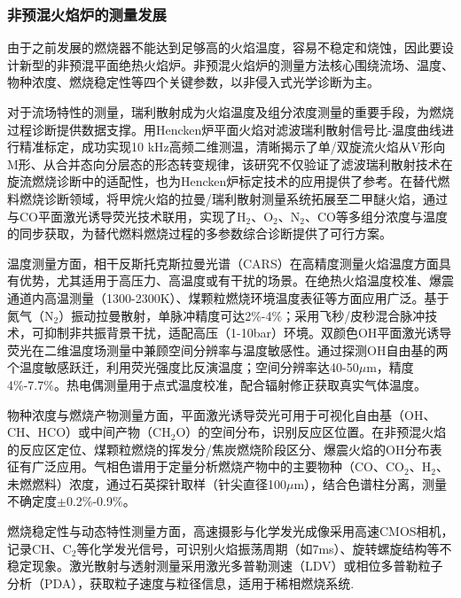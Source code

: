 \subsubsection{非预混火焰炉的测量发展}

由于之前发展的燃烧器不能达到足够高的火焰温度，容易不稳定和烧蚀，因此要设计新型的非预混平面绝热火焰炉。非预混火焰炉的测量方法核心围绕流场、温度、物种浓度、燃烧稳定性等四个关键参数，以非侵入式光学诊断为主。

对于流场特性的测量，瑞利散射成为火焰温度及组分浓度测量的重要手段，为燃烧过程诊断提供数据支撑。用Hencken炉平面火焰对滤波瑞利散射信号比-温度曲线进行精准标定，成功实现10 kHz高频二维测温，清晰揭示了单/双旋流火焰从V形向M形、从合并态向分层态的形态转变规律，该研究不仅验证了滤波瑞利散射技术在旋流燃烧诊断中的适配性，也为Hencken炉标定技术的应用提供了参考\cite{tao2020measurements}。在替代燃料燃烧诊断领域，将甲烷火焰的拉曼/瑞利散射测量系统拓展至二甲醚火焰，通过与CO平面激光诱导荧光技术联用，实现了H$_2$、O$_2$、N$_2$、CO等多组分浓度与温度的同步获取，为替代燃料燃烧过程的多参数综合诊断提供了可行方案\cite{li2024investigation, barlow2009raman}。

温度测量方面，相干反斯托克斯拉曼光谱（CARS）在高精度测量火焰温度方面具有优势，尤其适用于高压力、高温度或有干扰的场景\cite{shi2022compact}。在绝热火焰温度校准、爆震通道内高温测量（1300-2300K）、煤颗粒燃烧环境温度表征等方面应用广泛。基于氮气（N$_2$）振动拉曼散射，单脉冲精度可达2\%-4\%；采用飞秒/皮秒混合脉冲技术，可抑制非共振背景干扰，适配高压（1-10bar）环境。双颜色OH平面激光诱导荧光在二维温度场测量中兼顾空间分辨率与温度敏感性\cite{shi2022compact, barlow2009raman}。通过探测OH自由基的两个温度敏感跃迁，利用荧光强度比反演温度；空间分辨率达40-50$\mu$m，精度4\%-7.7\%\cite{hsu2021khz}。热电偶测量用于点式温度校准，配合辐射修正获取真实气体温度。

物种浓度与燃烧产物测量方面，平面激光诱导荧光可用于可视化自由基（OH、CH、HCO）或中间产物（CH$_2$O）的空间分布，识别反应区位置。在非预混火焰的反应区定位、煤颗粒燃烧的挥发分/焦炭燃烧阶段区分、爆震火焰的OH分布表征有广泛应用。气相色谱用于定量分析燃烧产物中的主要物种（CO、CO$_2$、H$_2$、未燃燃料）浓度，通过石英探针取样（针尖直径100$\mu$m），结合色谱柱分离，测量不确定度$\pm$0.2\%-0.9\%\cite{wagner2012absolute}。

燃烧稳定性与动态特性测量方面，高速摄影与化学发光成像采用高速CMOS相机，记录CH、C$_2$等化学发光信号，可识别火焰振荡周期（如7ms）、旋转螺旋结构等不稳定现象。激光散射与透射测量采用激光多普勒测速（LDV）或相位多普勒粒子分析（PDA），获取粒子速度与粒径信息，适用于稀相燃烧系统\cite{liu2018two}.

